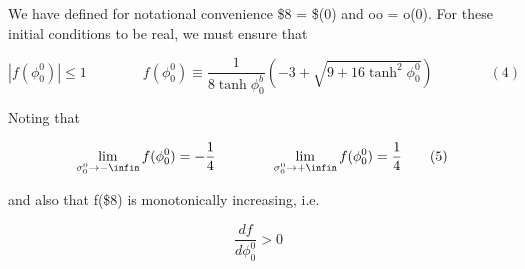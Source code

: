 \documentclass{article}
\begin{document}
We have defined for notational convenience \$8 = \$(0) and oo = o(0). For these initial
conditions to be real, we must ensure that


\begin{equation}
| f ( \phi _ { 0 } ^ { 0 } ) | \leq 1 \qquad \qquad f ( \phi _ { 0 } ^ { 0 } ) \equiv \frac { 1 } { 8 \operatorname { t a n h } \phi _ { 0 } ^ { b } } \left ( - 3 + \sqrt { 9 + 1 6 \operatorname { t a n h } ^ { 2 } \phi _ { 0 } ^ { 0 } } \right ) \qquad \qquad ( 4 )
\end{equation}


Noting that


\begin{equation}
~ \operatorname * { l i m } _ { \sigma _ { 0 } ^ { 0 } \rightarrow - \infin } f ( \phi _ { 0 } ^ { 0 } ) = - \frac 1 4 \qquad \qquad \operatorname * { l i m } _ { \sigma _ { 0 } ^ { 0 } \rightarrow + \infin } f ( \phi _ { 0 } ^ { 0 } ) = \frac 1 4 \qquad ( 5 )
\end{equation}


and also that f(\$8) is monotonically increasing, i.e.


\begin{equation}
\frac { d f } { d \phi _ { 0 } ^ { 0 } } > 0 ~
\end{equation}
\end{document}
